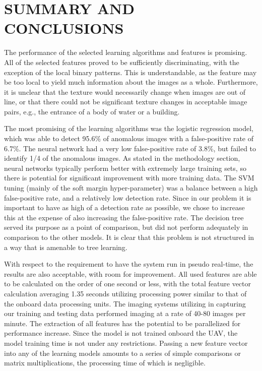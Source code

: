 


\chapter{SUMMARY AND CONCLUSIONS \label{cha:Summary}}

The performance of the selected learning algorithms and features is promising.
All of the selected features proved to be sufficiently discriminating, with the exception of the local binary patterns.
This is understandable, as the feature may be too local to yield much information about the images as a whole.
Furthermore, it is unclear that the texture would necessarily change when images are out of line, or that there could not be significant texture changes in acceptable image pairs, e.g., the entrance of a body of water or a building.

The most promising of the learning algorithms was the logistic regression model, which was able to detect 95.6\% of anomalous images with a false-positive rate of 6.7\%.
The neural network had a very low false-positive rate of 3.8\%, but failed to identify 1/4 of the anomalous images.
As stated in the methodology section, neural networks typically perform better with extremely large training sets, so there is potential for significant improvement with more training data.
The SVM tuning (mainly of the soft margin hyper-parameter) was a balance between a high false-positive rate, and a relatively low detection rate.
Since in our problem it is important to have as high of a detection rate as possible, we chose to increase this at the expense of also increasing the false-positive rate.
The decision tree served its purpose as a point of comparison, but did not perform adequately in comparison to the other models.
It is clear that this problem is not structured in a way that is amenable to tree learning.

With respect to the requirement to have the system run in pseudo real-time, the results are also acceptable, with room for improvement.
All used features are able to be calculated on the order of one second or less, with the total feature vector calculation averaging 1.35 seconds utilizing processing power similar to that of the onboard data processing units.
The imaging systems utilizing in capturing our training and testing data performed imaging at a rate of 40-80 images per minute.
The extraction of all features has the potential to be parallelized for performance increase.
Since the model is not trained onboard the UAV, the model training time is not under any restrictions.
Passing a new feature vector into any of the learning models amounts to a series of simple comparisons or matrix multiplications, the processing time of which is negligible.


